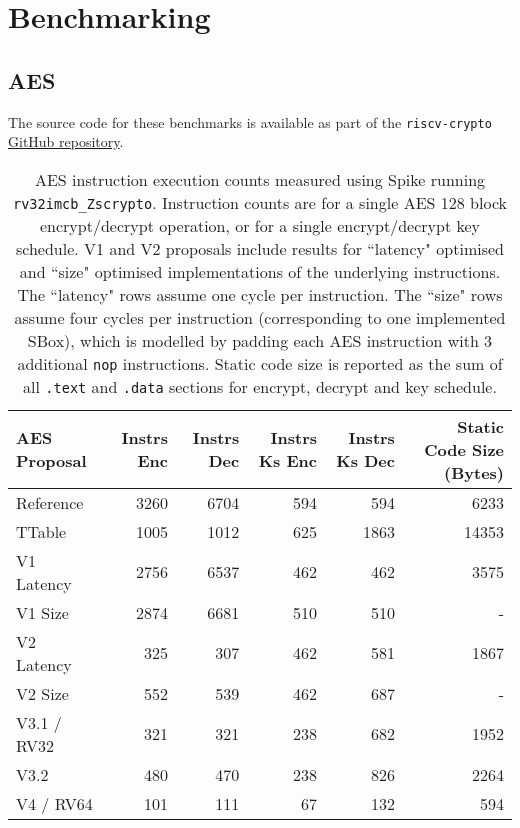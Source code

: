 
\section{Benchmarking}

\subsection{AES}
\label{sec:benchmark:aes}

The source code for these benchmarks is available as part of the
{\tt riscv-crypto} 
\href{https://github.com/scarv/riscv-crypto/tree/master/benchmarks/crypto_block/aes}{GitHub repository}.

\begin{table}[h]
\centering
\begin{tabular}{lrrrrr}
AES Proposal & Instrs Enc & Instrs Dec & Instrs Ks Enc & Instrs Ks Dec & Static Code Size (Bytes) \\ \hline
Reference   & 3260  & 6704  & 594  &  594  & 6233   \\
TTable      & 1005  & 1012  & 625  &  1863 & 14353  \\
V1 Latency  & 2756  & 6537  & 462  &  462  & 3575   \\
V1 Size     & 2874  & 6681  & 510  &  510  & -      \\
V2 Latency  & 325   & 307   & 462  &  581  & 1867   \\
V2 Size     & 552   & 539   & 462  &  687  & -      \\
V3.1 / RV32 & 321   & 321   & 238  &  682  & 1952   \\
V3.2        & 480   & 470   & 238  &  826  & 2264   \\
V4 / RV64   & 101   & 111   & 67   &  132  & 594     \\
\end{tabular}
\caption{
AES instruction execution counts measured using Spike
running {\tt rv32imcb\_Zscrypto}.
Instruction counts are for a single AES 128 block encrypt/decrypt operation,
or for a single encrypt/decrypt key schedule.
V1 and V2 proposals include results for ``latency" optimised and ``size"
optimised implementations of the underlying instructions.
The ``latency" rows assume one cycle per instruction.
The ``size" rows assume four cycles per instruction (corresponding to
one implemented SBox), which is modelled by padding each AES instruction
with 3 additional {\tt nop} instructions.
Static code size is reported as the sum of all {\tt .text} and {\tt .data}
sections for encrypt, decrypt and key schedule.
}
\label{tab:benchmarks:aes:perf}
\end{table}


